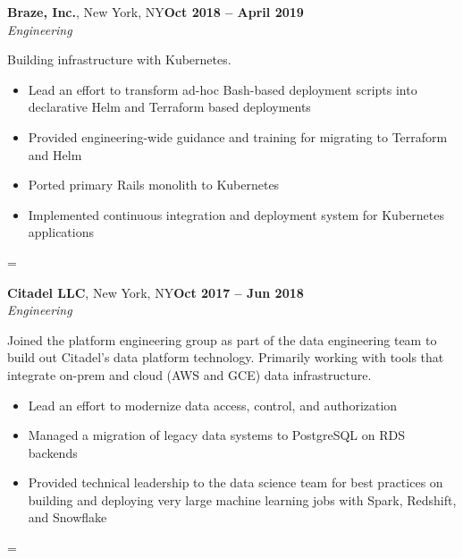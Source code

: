 \documentclass[margin,line]{resume}
\newenvironment{absolutelynopagebreak}
  {\par\nobreak\vfil\penalty0\vfilneg
   \vtop\bgroup}
  {\par\xdef\tpd{\the\prevdepth}\egroup
   \prevdepth=\tpd}
\begin{document}
\begin{resume}
    \vspace{5mm}

    \begin{absolutelynopagebreak}
    \textbf{Braze, Inc.}, New York, NY\hfill \textbf{Oct 2018 -- April 2019}\vspace{2mm}\\\vspace{1mm}%
    \textsl{Engineering}

    Building infrastructure with Kubernetes.
    
    \begin{itemize}
        \item Lead an effort to transform ad-hoc Bash-based deployment scripts
        into declarative Helm and Terraform based deployments
        \item Provided engineering-wide guidance and training for migrating to
        Terraform and Helm
        \item Ported primary Rails monolith to Kubernetes
        \item Implemented continuous integration and deployment system for
        Kubernetes applications
    \end{itemize}
    \end{absolutelynopagebreak}

    \vspace{5mm}

    \begin{absolutelynopagebreak}
    \textbf{Citadel LLC}, New York, NY\hfill \textbf{Oct 2017 -- Jun 2018}\vspace{2mm}\\\vspace{1mm}%
    \textsl{Engineering}

    Joined the platform engineering group as part of the data engineering
    team to build out Citadel's data platform technology. Primarily working
    with tools that integrate on-prem and cloud (AWS and GCE) data
    infrastructure.

    \begin{itemize}
        \item Lead an effort to modernize data access, control, and
        authorization
        \item Managed a migration of legacy data systems to PostgreSQL on RDS
        backends
        \item Provided technical leadership to the data science team for best
        practices on building and deploying very large machine learning jobs
        with Spark, Redshift, and Snowflake
    \end{itemize}
    \end{absolutelynopagebreak}


\end{resume}
\end{document}
